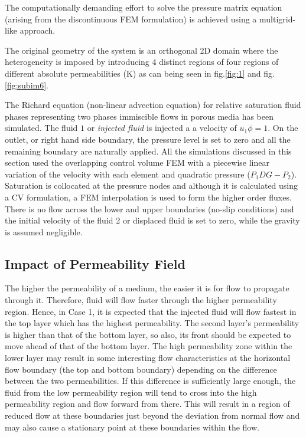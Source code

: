 \documentclass[preprint,authoryear,12pt]{elsarticle}
\begin{document}
The computationally demanding effort to solve the pressure matrix equation (arising from the discontinuous FEM formulation) is achieved using a multigrid-like approach. 

The original geometry of the system is an orthogonal 2D domain where the  heterogeneity is imposed by introducing 4 distinct regions of four regions of different absolute permeabilities (K) as can being seen in fig.\ref{fig:1} and fig. \ref{fig:subim6}.   

The Richard equation (non-linear advection equation) for relative saturation fluid phases representing two phases immiscible flows in porous media has been simulated. The fluid $1$ or \textit{injected fluid} is injected a a velocity of $u_1 \phi = 1$. On the outlet, or right hand side boundary, the pressure level is set to zero and all the remaining boundary are naturally applied. All the simulations discussed in this section used the overlapping control volume FEM with a piecewise linear variation of the velocity with each element and quadratic pressure ($P_1 DG-P_2$). Saturation is collocated at the  pressure nodes and although it is calculated using a CV formulation, a FEM interpolation is used to form the higher order fluxes. There is no flow across the lower and upper boundaries (no-slip conditions) and the initial velocity of the fluid 2 or displaced fluid is set to zero, while the gravity is assumed negligible.   


\subsection{Impact of Permeability Field}\label{section:PermeabilityAnalysis}

The higher the permeability of a medium, the easier it is for flow to propagate through it. Therefore, fluid will flow faster through the higher permeability region. Hence, in Case 1, it is expected that the injected fluid will flow fastest in the top layer which has the highest permeability. The second layer's permeability is higher than that of the bottom layer, so also, its front should be expected to move ahead of that of the bottom layer. The high permeability zone within the lower layer may result in some interesting flow characteristics at the horizontal flow boundary (the top and bottom boundary) depending on the difference between the two permeabilities. If this difference is sufficiently large enough, the fluid from the low permeability region will tend to cross into the high permeability region and flow forward from there. This will result in a region of reduced flow at these boundaries just beyond the deviation from normal flow and may also cause a stationary point at these boundaries within the flow.
\end{document}
